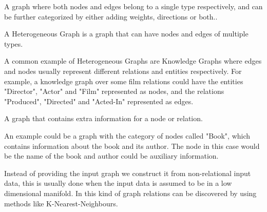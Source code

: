 \begin{definition} A graph where both nodes and edges belong to a single type respectively, and can be further categorized by either adding weights, directions or both.\cite{8294302}.
\end{definition}

\begin{definition} A Heterogeneous Graph is a graph that can have nodes and edges of multiple types\cite{8294302}.
\end{definition}

A common example of Heterogeneous Graphs are Knowledge Graphs where edges and nodes usually represent different relations and entities respectively. For example, a knowledge graph over some film relations could have the entities "Director", "Actor" and "Film" represented as nodes, and the relations "Produced", "Directed" and "Acted-In" represented as edges.

\begin{definition} A graph that contains extra information for a node or relation.
\end{definition}

An example could be a graph with the category of nodes called "Book", which contains information about the book and its author. The node in this case would be the name of the book and author could be auxiliary information\cite{8294302}.

\begin{definition} Instead of providing the input graph we construct it from non-relational input data, this is usually done when the input data is assumed to be in a low dimensional manifold. In this kind of graph relations can be discovered by using methods like K-Nearest-Neighbours\cite{8294302}.
\end{definition}
